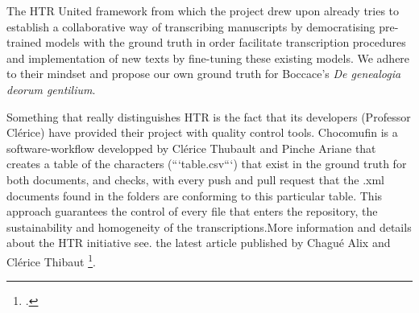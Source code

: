 \documentclass[12pt]{article}
\begin{document}
The HTR United framework from which the project drew upon already tries to establish a collaborative way of transcribing manuscripts by democratising pre-trained models with the ground truth in order facilitate transcription procedures and implementation of new texts by fine-tuning these existing models. We adhere to their mindset and propose our own ground truth for Boccace's \textit{De genealogia deorum gentilium}.

Something that really distinguishes HTR is the fact that its developers (Professor Clérice) have provided  their project with quality control tools. Chocomufin is a software-workflow developped by Clérice Thubault and Pinche Ariane that creates a table of the characters (```table.csv```) that exist in the ground truth for both documents, and checks, with every push and pull request that the .xml documents found in the folders are conforming to this particular table. This approach guarantees the control of every file that enters the repository, the sustainability and homogeneity of the transcriptions.More information and details about the HTR initiative see. the latest article published by Chagué Alix and Clérice Thibaut \footcite{chagueclerice2021}. 

\clearpage

\tableofcontents
%
\printbibliography
%
\end{document}
